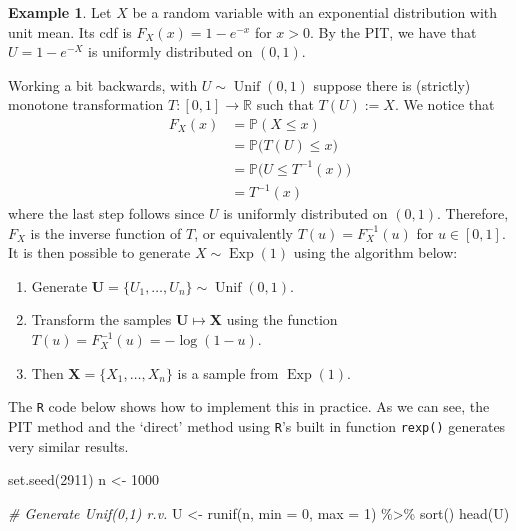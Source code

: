 \documentclass[
]{book}
\newenvironment{Shaded}{\begin{snugshade}}{\end{snugshade}}
\newcommand{\AttributeTok}[1]{\textcolor[rgb]{0.77,0.63,0.00}{#1}}
\newcommand{\CommentTok}[1]{\textcolor[rgb]{0.56,0.35,0.01}{\textit{#1}}}
\newcommand{\DecValTok}[1]{\textcolor[rgb]{0.00,0.00,0.81}{#1}}
\newcommand{\FunctionTok}[1]{\textcolor[rgb]{0.00,0.00,0.00}{#1}}
\newcommand{\NormalTok}[1]{#1}
\newcommand{\OtherTok}[1]{\textcolor[rgb]{0.56,0.35,0.01}{#1}}
\newcommand{\SpecialCharTok}[1]{\textcolor[rgb]{0.00,0.00,0.00}{#1}}
\providecommand{\tightlist}{%
  \setlength{\itemsep}{0pt}\setlength{\parskip}{0pt}}
\newcommand{\bU}{{\boldsymbol U}}
\newcommand{\bX}{{\boldsymbol X}}
\DeclareMathOperator{\Exp}{Exp}
\DeclareMathOperator{\Unif}{Unif}
\newcommand{\bbR}{\mathbb{R}}
\newcommand{\bbP}{\mathbb{P}}
\theoremstyle{definition}
\theoremstyle{definition}
\newtheorem{example}{Example}[chapter]
\theoremstyle{definition}
\theoremstyle{definition}
\theoremstyle{remark}
\begin{document}
\begin{example}

Let \(X\) be a random variable with an exponential distribution with unit mean.
Its cdf is \(F_X(x) = 1 - e^{-x}\) for \(x>0\).
By the PIT, we have that \(U=1-e^{-X}\) is uniformly distributed on \((0,1)\).

Working a bit backwards, with \(U\sim\Unif(0,1)\) suppose there is (strictly) monotone transformation \(T:[0,1]\to\bbR\) such that \(T(U) := X\). We notice that
\begin{align*}
F_X(x) &= \bbP(X \leq x) \\
&= \bbP\big(T(U) \leq x \big)\\
&= \bbP\big(U \leq T^{-1}(x)\big) \\
&= T^{-1}(x)
\end{align*}
where the last step follows since \(U\) is uniformly distributed on \((0,1)\).
Therefore, \(F_X\) is the inverse function of \(T\), or equivalently \(T(u)=F_X^{-1}(u)\) for \(u\in[0,1]\).
It is then possible to generate \(X\sim\Exp(1)\) using the algorithm below:

\begin{enumerate}
\def\labelenumi{\arabic{enumi}.}
\tightlist
\item
  Generate \(\bU = \{U_1,\dots,U_n\} \sim\Unif(0,1)\).
\item
  Transform the samples \(\bU \mapsto \bX\) using the function \(T(u) = F_X^{-1}(u) = -\log(1-u)\).
\item
  Then \(\bX = \{X_1,\dots,X_n\}\) is a sample from \(\Exp(1)\).
\end{enumerate}

The \texttt{R} code below shows how to implement this in practice. As we can see, the PIT method and the `direct' method using \texttt{R}'s built in function \texttt{rexp()} generates very similar results.

\begin{Shaded}
\begin{Highlighting}[]
\FunctionTok{set.seed}\NormalTok{(}\DecValTok{2911}\NormalTok{)}
\NormalTok{n }\OtherTok{\textless{}{-}} \DecValTok{1000}

\CommentTok{\# Generate Unif(0,1) r.v.}
\NormalTok{U }\OtherTok{\textless{}{-}} \FunctionTok{runif}\NormalTok{(n, }\AttributeTok{min =} \DecValTok{0}\NormalTok{, }\AttributeTok{max =} \DecValTok{1}\NormalTok{) }\SpecialCharTok{\%\textgreater{}\%} \FunctionTok{sort}\NormalTok{()}
\FunctionTok{head}\NormalTok{(U)}
\end{Highlighting}
\end{Shaded}


\end{example}
\end{document}
